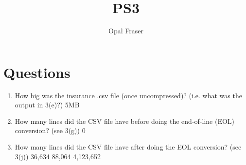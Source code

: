 \documentclass{article}
\title{PS3}
\author{Opal Fraser}
\begin{document}
\maketitle
\section{Questions}
\begin{enumerate}
\item How big was the insurance .csv file (once uncompressed)? (i.e. what was the
output in 3(e)?) 5MB
\item How many lines did the CSV file have before doing the end-of-line (EOL) conversion? (see 3(g)) 0 
\item How many lines did the CSV file have after doing the EOL conversion? (see 3(j)) 36,634 88,064 4,123,652
\end{enumerate}
\end{document}
